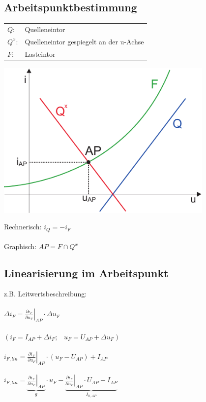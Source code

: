 \documentclass[a4paper,twocolumn,10pt]{article}
\begin{document}
\subsection*{Arbeitspunktbestimmung}
\begin{tabular}{ll}
$Q$: & Quelleneintor\\
$Q^x$: & Quelleneintor gespiegelt an der u-Achse\\
$F$: & Lasteintor
\end{tabular}
\begin{minipage}[b]{0.23\textwidth}
\centering
\includegraphics[width=0.8\textwidth]{Grafiken/Arbeitspunkt}\\
\end{minipage}
\hfill
\begin{minipage}[b]{0.23\textwidth}
Rechnerisch: $i_Q=-i_F$\\\\
Graphisch: $AP=F\cap Q^x$
\end{minipage}

\subsection*{Linearisierung im Arbeitspunkt}
z.B. Leitwertsbeschreibung:\\\\
$\Delta i_F=\left.\frac{\partial i_F}{\partial u_F} \right|_{AP}\cdot \Delta u_F$\\\\
$(i_F=I_{AP}+\Delta i_F;\;\;\;u_F=U_{AP}+\Delta u_F)$\\\\
$i_{F,lin}=\left.\frac{\partial i_F}{\partial u_F} \right|_{AP}\cdot (u_F-U_{AP})+I_{AP}$\\\\
$i_{F,lin}=\underbrace{\left.\frac{\partial i_F}{\partial u_F} \right|_{AP}}_{g}\cdot u_F-\underbrace{\left.\frac{\partial i_F}{\partial u_F} \right|_{AP}\cdot U_{AP}+I_{AP}}_{I_{0,AP}}$
\end{document}
